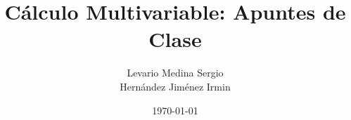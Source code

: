 \documentclass[12pt,a4paper]{article}
\begin{document}
\title{Cálculo Multivariable: Apuntes de Clase}
\author{Levario Medina Sergio \\ Hernández Jiménez Irmin}
\date{\today}
\maketitle

\tableofcontents
\newpage




















 















































\end{document}
